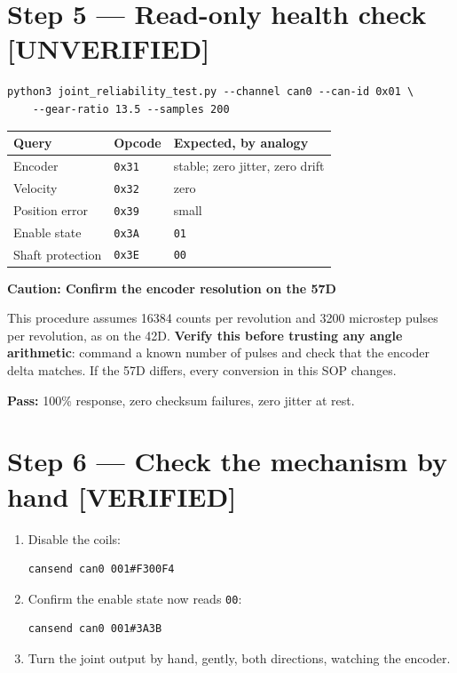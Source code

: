\documentclass[11pt,letterpaper]{article}
\newenvironment{caution}[1]{%
    \par\addvspace{8pt}%
    \noindent{\color{cautionred}\rule{\linewidth}{0.8pt}}\par\vspace{2pt}
    \noindent\textbf{\color{cautionred}Caution: #1}\par\vspace{2pt}
}{%
    \par\vspace{2pt}\noindent{\color{cautionred}\rule{\linewidth}{0.4pt}}%
    \par\addvspace{8pt}%
}
\newcommand{\verified}{{\color{okgreen}\textbf{[VERIFIED]}}}
\newcommand{\unverified}{{\color{unverifiedorange}\textbf{[UNVERIFIED]}}}
\newcommand{\passif}[1]{\par\vspace{2pt}\noindent\textbf{\color{okgreen}Pass:} #1\par\vspace{4pt}}
\begin{document}
\section*{Step 5 --- Read-only health check \unverified}

\begin{lstlisting}
python3 joint_reliability_test.py --channel can0 --can-id 0x01 \
    --gear-ratio 13.5 --samples 200
\end{lstlisting}

\begin{center}
\begin{tabular}{lll}
\toprule
\textbf{Query} & \textbf{Opcode} & \textbf{Expected, by analogy} \\ \midrule
Encoder          & \texttt{0x31} & stable; zero jitter, zero drift \\
Velocity         & \texttt{0x32} & zero \\
Position error   & \texttt{0x39} & small \\
Enable state     & \texttt{0x3A} & \texttt{01} \\
Shaft protection & \texttt{0x3E} & \texttt{00} \\
\bottomrule
\end{tabular}
\end{center}

\begin{caution}{Confirm the encoder resolution on the 57D}
This procedure assumes 16384 counts per revolution and 3200 microstep pulses per
revolution, as on the 42D. \textbf{Verify this before trusting any angle
arithmetic}: command a known number of pulses and check that the encoder delta
matches. If the 57D differs, every conversion in this SOP changes.
\end{caution}

\passif{100\% response, zero checksum failures, zero jitter at rest.}

\section*{Step 6 --- Check the mechanism by hand \verified}

\begin{enumerate}[leftmargin=*]
    \item Disable the coils:
\begin{lstlisting}
cansend can0 001#F300F4
\end{lstlisting}
    \item Confirm the enable state now reads \texttt{00}:
\begin{lstlisting}
cansend can0 001#3A3B
\end{lstlisting}
    \item Turn the joint output by hand, gently, both directions, watching the
          encoder.
\end{enumerate}
\end{document}
